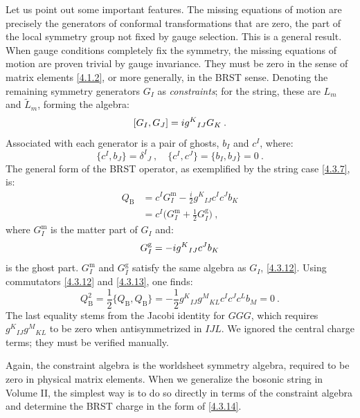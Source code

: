Let us point out some important features. The missing equations of motion are precisely the generators of conformal transformations that are zero, the part of the local symmetry group not fixed by gauge selection. This is a general result. When gauge conditions completely fix the symmetry, the missing equations of motion are proven trivial by gauge invariance. They must be zero in the sense of matrix elements \eqref{4.1.2}, or more generally, in the BRST sense. Denoting the remaining symmetry generators $G_{I}$ as \emph{constraints}; for the string, these are $L_{m}$ and $\tilde{L}_{m}$, forming the algebra:
\begin{equation}\label{4.3.12}
[G_{I}, G_{J}]=i g^{K}{}_{I J} G_{K} \:. 
\end{equation}
Associated with each generator is a pair of ghosts, $b_{I}$ and $c^{I}$, where:
\begin{equation}\label{4.3.13}
\{c^{I}, b_{J} \}=\delta^{I}{}_{J}\:, \quad \{c^{I}, c^{J}\}=\{b_{I}, b_{J}\}=0 \:.
\end{equation}
The general form of the BRST operator, as exemplified by the string case \eqref{4.3.7}, is:
\begin{equation}\label{4.3.14}
\begin{aligned}
	Q_{\mathrm{B}} &=c^{I} G_{I}^{\mathrm{m}}-\frac{i}{2} g^{K}{ }_{I J} c^{I} c^{J} b_{K} \\
	&=c^{I}\biggl(G_{I}^{\mathrm{m}}+\frac{1}{2} G_{I}^{\mathrm{g}}\biggr) \:,
\end{aligned}
\end{equation}
where $G_{I}^{\mathrm{m}}$ is the matter part of $G_{I}$ and:
\begin{equation}
G_{I}^{\mathrm{g}}=-i g^{K}{}_{I J} c^{J} b_{K} \label{4.3.15}
\end{equation}
is the ghost part. $G_{I}^{\mathrm{m}}$ and $G_{I}^{\mathrm{g}}$ satisfy the same algebra as $G_{I}$, \eqref{4.3.12}. Using commutators \eqref{4.3.12} and \eqref{4.3.13}, one finds:
\begin{equation}
Q_{\mathrm{B}}^{2}=\frac{1}{2} \{Q_{\mathrm{B}}, Q_{\mathrm{B}}\}=-\frac{1}{2} g^{K}{}_{I J} g^{M}{}_{K L} c^{I} c^{J} c^{L} b_{M}=0 \:. \label{4.3.16}
\end{equation}
The last equality stems from the Jacobi identity for $GGG$, which requires $g^{K}{}_{I J} g^{M}{}_{K L}$ to be zero when antisymmetrized in $IJL$. We ignored the central charge terms; they must be verified manually.

Again, the constraint algebra is the worldsheet symmetry algebra, required to be zero in physical matrix elements. When we generalize the bosonic string in Volume II, the simplest way is to do so directly in terms of the constraint algebra and determine the BRST charge in the form of \eqref{4.3.14}.

